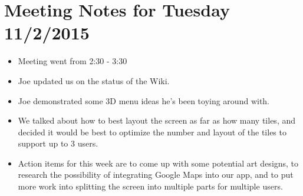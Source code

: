 \documentclass[]{article}
\begin{document}
\section{Meeting Notes for Tuesday 11/2/2015}
\begin{itemize}
	\item Meeting went from 2:30 - 3:30
	\item Joe updated us on the status of the Wiki. 
	\item Joe demonstrated some 3D menu ideas he's been toying around with. 
	\item We talked about how to best layout the screen as far as how many tiles, and decided it would be best to optimize the number and layout of the tiles to support up to 3 users. 
	\item Action items for this week are to come up with some potential art designs, to research the possibility of integrating Google Maps into our app, and to put more work into splitting the screen into multiple parts for multiple users. 
\end{itemize}
	
\end{document}
